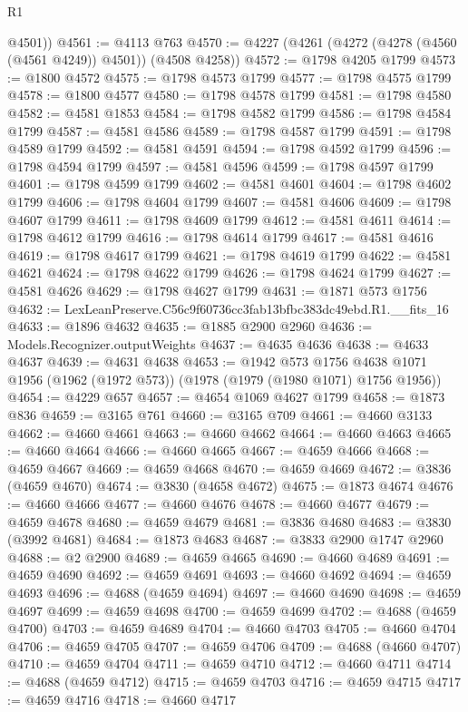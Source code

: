 \begin{lexlean}{R1}
\begin{coremodule}
        @4501))
@4561 := @4113 @763
@4570 := @4227 (@4261 (@4272 (@4278 (@4560 (@4561 @4249)) @4501)) (@4508 @4258))
@4572 := @1798 @4205 @1799
@4573 := @1800 @4572
@4575 := @1798 @4573 @1799
@4577 := @1798 @4575 @1799
@4578 := @1800 @4577
@4580 := @1798 @4578 @1799
@4581 := @1798 @4580
@4582 := @4581 @1853
@4584 := @1798 @4582 @1799
@4586 := @1798 @4584 @1799
@4587 := @4581 @4586
@4589 := @1798 @4587 @1799
@4591 := @1798 @4589 @1799
@4592 := @4581 @4591
@4594 := @1798 @4592 @1799
@4596 := @1798 @4594 @1799
@4597 := @4581 @4596
@4599 := @1798 @4597 @1799
@4601 := @1798 @4599 @1799
@4602 := @4581 @4601
@4604 := @1798 @4602 @1799
@4606 := @1798 @4604 @1799
@4607 := @4581 @4606
@4609 := @1798 @4607 @1799
@4611 := @1798 @4609 @1799
@4612 := @4581 @4611
@4614 := @1798 @4612 @1799
@4616 := @1798 @4614 @1799
@4617 := @4581 @4616
@4619 := @1798 @4617 @1799
@4621 := @1798 @4619 @1799
@4622 := @4581 @4621
@4624 := @1798 @4622 @1799
@4626 := @1798 @4624 @1799
@4627 := @4581 @4626
@4629 := @1798 @4627 @1799
@4631 := @1871 @573 @1756
@4632 := LexLeanPreserve.C56c9f60736cc3fab13bfbc383dc49ebd.R1.__fits_16
@4633 := @1896 @4632
@4635 := @1885 @2900 @2960
@4636 := Models.Recognizer.outputWeights
@4637 := @4635 @4636
@4638 := @4633 @4637
@4639 := @4631 @4638
@4653 := @1942
    @573
    @1756
    @4638
    @1071
    @1956
    (@1962 (@1972 @573))
    (@1978 (@1979 (@1980 @1071) @1756 @1956))
@4654 := @4229 @657
@4657 := @4654 @1069 @4627 @1799
@4658 := @1873 @836
@4659 := @3165 @761
@4660 := @3165 @709
@4661 := @4660 @3133
@4662 := @4660 @4661
@4663 := @4660 @4662
@4664 := @4660 @4663
@4665 := @4660 @4664
@4666 := @4660 @4665
@4667 := @4659 @4666
@4668 := @4659 @4667
@4669 := @4659 @4668
@4670 := @4659 @4669
@4672 := @3836 (@4659 @4670)
@4674 := @3830 (@4658 @4672)
@4675 := @1873 @4674
@4676 := @4660 @4666
@4677 := @4660 @4676
@4678 := @4660 @4677
@4679 := @4659 @4678
@4680 := @4659 @4679
@4681 := @3836 @4680
@4683 := @3830 (@3992 @4681)
@4684 := @1873 @4683
@4687 := @3833 @2900 @1747 @2960
@4688 := @2 @2900
@4689 := @4659 @4665
@4690 := @4660 @4689
@4691 := @4659 @4690
@4692 := @4659 @4691
@4693 := @4660 @4692
@4694 := @4659 @4693
@4696 := @4688 (@4659 @4694)
@4697 := @4660 @4690
@4698 := @4659 @4697
@4699 := @4659 @4698
@4700 := @4659 @4699
@4702 := @4688 (@4659 @4700)
@4703 := @4659 @4689
@4704 := @4660 @4703
@4705 := @4660 @4704
@4706 := @4659 @4705
@4707 := @4659 @4706
@4709 := @4688 (@4660 @4707)
@4710 := @4659 @4704
@4711 := @4659 @4710
@4712 := @4660 @4711
@4714 := @4688 (@4659 @4712)
@4715 := @4659 @4703
@4716 := @4659 @4715
@4717 := @4659 @4716
@4718 := @4660 @4717

\end{coremodule}
\end{lexlean}
